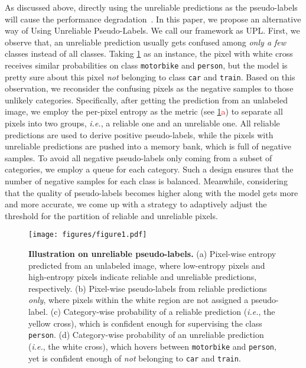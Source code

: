 \documentclass[10pt, twocolumn, letterpaper]{article}
\begin{document}
As discussed above, directly using the unreliable predictions as the pseudo-labels will cause the performance degradation~\cite{arazo2020pseudo}.
In this paper, we propose an alternative way of Using Unreliable Pseudo-Labels.
We call our framework as UPL.
First, we observe that, an unreliable prediction usually gets confused among \textit{only a few} classes instead of all classes.
Taking \cref{fig:example} as an instance, the pixel with white cross receives similar probabilities on class \texttt{motorbike} and \texttt{person}, but the model is pretty sure about this pixel \textit{not} belonging to class \texttt{car} and \texttt{train}.
Based on this observation, we reconsider the confusing pixels as the negative samples to those unlikely categories.
Specifically, after getting the prediction from an unlabeled image, we employ the per-pixel entropy as the metric (see \cref{fig:example}\textcolor{red}{a}) to separate all pixels into two groups, \textit{i.e.}, a reliable one and an unreliable one.
All reliable predictions are used to derive positive pseudo-labels, while the pixels with unreliable predictions are pushed into a memory bank, which is full of negative samples.
To avoid all negative pseudo-labels only coming from a subset of categories, we employ a queue for each category.
Such a design ensures that the number of negative samples for each class is balanced.
Meanwhile, considering that the quality of pseudo-labels becomes higher along with the model gets more and more accurate, we come up with a strategy to adaptively adjust the threshold for the partition of reliable and unreliable pixels.


\begin{figure}[t]
    \centering
    \texttt{[image: figures/figure1.pdf]}
    \vspace{-18pt}
    \caption{
        \textbf{Illustration on unreliable pseudo-labels.}
(a) Pixel-wise entropy predicted from an unlabeled image, where low-entropy pixels and high-entropy pixels indicate reliable and unreliable predictions, respectively.
(b) Pixel-wise pseudo-labels from reliable predictions \textit{only}, where pixels within the white region are not assigned a pseudo-label.
(c) Category-wise probability of a reliable prediction (\textit{i.e.}, the yellow cross), which is confident enough for supervising the class \texttt{person}.
(d) Category-wise probability of an unreliable prediction (\textit{i.e.}, the white cross), which hovers between \texttt{motorbike} and \texttt{person}, yet is confident enough of \textit{not} belonging to \texttt{car} and \texttt{train}.
    }
    \label{fig:example}
    \vspace{-12pt}
\end{figure}
\end{document}
